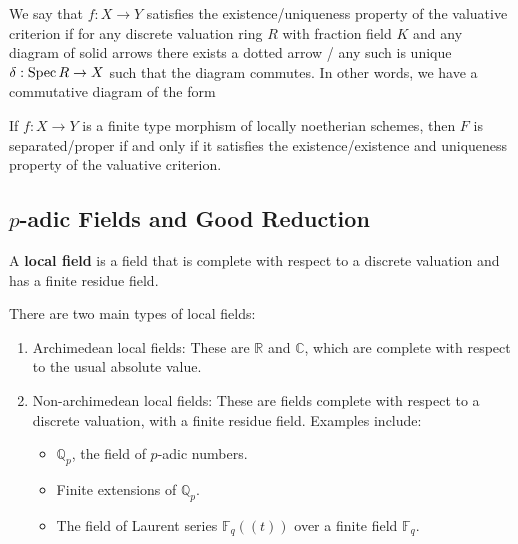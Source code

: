 \documentclass[12pt]{article}
\begin{document}
\begin{definition}
    
We say that $f:X\to Y$ satisfies the existence/uniqueness property of the valuative criterion if for any discrete valuation ring $R$ with fraction field $K$ and any diagram of solid arrows there exists a  dotted arrow / any such is unique $\delta: \operatorname{Spec} R \to X$ such that the diagram commutes. In other words, we have a commutative diagram of the form
\begin{center}
\end{center}
\end{definition}
\begin{theorem}
    If $f:X\to Y$ is a finite type morphism of locally noetherian schemes, then $F$ is separated/proper if and only if it satisfies the existence/existence and uniqueness property of the valuative criterion.
\end{theorem}

\subsection{\(p\)-adic Fields and Good Reduction}
\begin{definition}
        A \textbf{local field} is a field that is complete with respect to a discrete valuation and has a finite residue field. 
\end{definition}

There are two main types of local fields:
        \begin{enumerate}
            \item Archimedean local fields: These are \(\mathbb{R}\) and \(\mathbb{C}\), which are complete with respect to the usual absolute value.
            \item Non-archimedean local fields: These are fields complete with respect to a discrete valuation, with a finite residue field. Examples include:
            \begin{itemize}
                \item \(\mathbb{Q}_p\), the field of \(p\)-adic numbers.
                \item Finite extensions of \(\mathbb{Q}_p\).
                \item The field of Laurent series \(\mathbb{F}_q((t))\) over a finite field \(\mathbb{F}_q\).
            \end{itemize}
        \end{enumerate}
\end{document}
